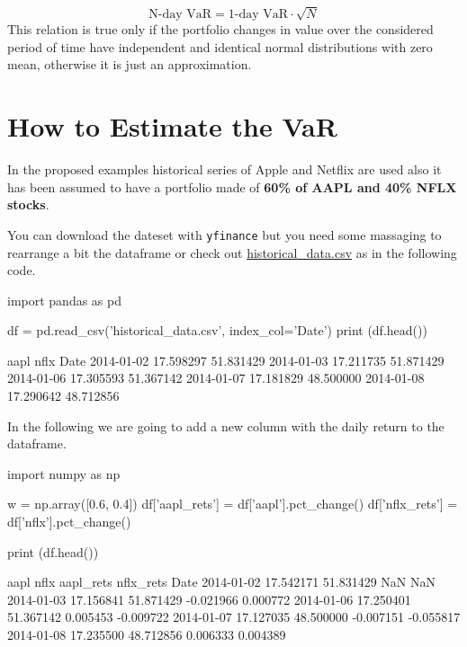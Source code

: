 \begin{equation}
\textrm{N-day VaR} = \textrm{1-day VaR}\cdot \sqrt{N}
\label{eq:var_horizon}
\end{equation}
This relation is true only if the portfolio changes in value over the considered period of time have independent and identical normal distributions with zero mean, otherwise it is just an approximation.

\section{How to Estimate the VaR}
\label{how-to-estimate-the-var}

In the proposed examples historical series of Apple and Netflix are used also it has been assumed to have a portfolio made of \textbf{60\% of AAPL and 40\% NFLX stocks}.
 
You can download the dateset with \texttt{yfinance} but you need some massaging to rearrange a bit the dataframe or check out \href{https://raw.githubusercontent.com/matteosan1/finance_course/develop/libro/input_files/historical_data.csv}{historical\_data.csv} as in the following code.

\begin{ipython}
import pandas as pd

df = pd.read_csv('historical_data.csv', index_col='Date')	
print (df.head())
\end{ipython}
\begin{ioutput}
                 aapl       nflx
Date
2014-01-02  17.598297  51.831429
2014-01-03  17.211735  51.871429
2014-01-06  17.305593  51.367142
2014-01-07  17.181829  48.500000
2014-01-08  17.290642  48.712856
\end{ioutput}
\noindent
In the following we are going to add a new column with the daily return to the dataframe.

\begin{ipython}
import numpy as np

w = np.array([0.6, 0.4])
df['aapl_rets'] = df['aapl'].pct_change()
df['nflx_rets'] = df['nflx'].pct_change()

print (df.head())
\end{ipython}
\begin{ioutput}
                 aapl       nflx  aapl_rets  nflx_rets
Date                                                  
2014-01-02  17.542171  51.831429        NaN        NaN
2014-01-03  17.156841  51.871429  -0.021966   0.000772
2014-01-06  17.250401  51.367142   0.005453  -0.009722
2014-01-07  17.127035  48.500000  -0.007151  -0.055817
2014-01-08  17.235500  48.712856   0.006333   0.004389
\end{ioutput}

